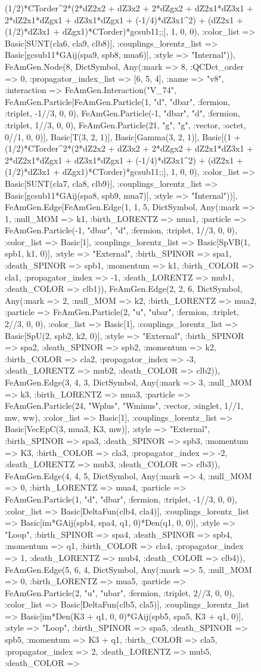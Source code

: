 \documentclass{revtex4}
\begin{document}
\begin{figure}[!htb]
\begin{center}
{(1/2)*CTorder^2*(2*dZ2x2 + dZ3x2 + 2*dZgx2 + dZ2x1*dZ3x1 + 2*dZ2x1*dZgx1 + dZ3x1*dZgx1 + (-1/4)*dZ3x1^2) + (dZ2x1 + (1/2)*dZ3x1 + dZgx1)*CTorder)*gcsub11;;], 1, 0, 0), :color_list => Basic[SUNT(cla6, cla9, clb8)], :couplings_lorentz_list => Basic[gcsub11*GAij(spa9, spb8, mua6)], :style => "Internal")), FeAmGen.Node(8, Dict{Symbol, Any}(:mark => 8, :QCDct_order => 0, :propagator_index_list => [6, 5, 4], :name => "v8", :interaction => FeAmGen.Interaction("V_74", FeAmGen.Particle[FeAmGen.Particle(1, "d", "dbar", :fermion, :triplet, -1//3, 0, 0), FeAmGen.Particle(-1, "dbar", "d", :fermion, :triplet, 1//3, 0, 0), FeAmGen.Particle(21, "g", "g", :vector, :octet, 0//1, 0, 0)], Basic[T(3, 2, 1)], Basic[Gamma(3, 2, 1)], Basic[(1 + (1/2)*CTorder^2*(2*dZ2x2 + dZ3x2 + 2*dZgx2 + dZ2x1*dZ3x1 + 2*dZ2x1*dZgx1 + dZ3x1*dZgx1 + (-1/4)*dZ3x1^2) + (dZ2x1 + (1/2)*dZ3x1 + dZgx1)*CTorder)*gcsub11;;], 1, 0, 0), :color_list => Basic[SUNT(cla7, cla8, clb9)], :couplings_lorentz_list => Basic[gcsub11*GAij(spa8, spb9, mua7)], :style => "Internal"))], FeAmGen.Edge[FeAmGen.Edge(1, 1, 5, Dict{Symbol, Any}(:mark => 1, :null_MOM => k1, :birth_LORENTZ => mua1, :particle => FeAmGen.Particle(-1, "dbar", "d", :fermion, :triplet, 1//3, 0, 0), :color_list => Basic[1], :couplings_lorentz_list => Basic[SpVB(1, spb1, k1, 0)], :style => "External", :birth_SPINOR => spa1, :death_SPINOR => spb1, :momentum => k1, :birth_COLOR => cla1, :propagator_index => -1, :death_LORENTZ => mub1, :death_COLOR => clb1)), FeAmGen.Edge(2, 2, 6, Dict{Symbol, Any}(:mark => 2, :null_MOM => k2, :birth_LORENTZ => mua2, :particle => FeAmGen.Particle(2, "u", "ubar", :fermion, :triplet, 2//3, 0, 0), :color_list => Basic[1], :couplings_lorentz_list => Basic[SpU(2, spb2, k2, 0)], :style => "External", :birth_SPINOR => spa2, :death_SPINOR => spb2, :momentum => k2, :birth_COLOR => cla2, :propagator_index => -3, :death_LORENTZ => mub2, :death_COLOR => clb2)), FeAmGen.Edge(3, 4, 3, Dict{Symbol, Any}(:mark => 3, :null_MOM => k3, :birth_LORENTZ => mua3, :particle => FeAmGen.Particle(24, "Wplus", "Wminus", :vector, :singlet, 1//1, mw, ww), :color_list => Basic[1], :couplings_lorentz_list => Basic[VecEpC(3, mua3, K3, mw)], :style => "External", :birth_SPINOR => spa3, :death_SPINOR => spb3, :momentum => K3, :birth_COLOR => cla3, :propagator_index => -2, :death_LORENTZ => mub3, :death_COLOR => clb3)), FeAmGen.Edge(4, 4, 5, Dict{Symbol, Any}(:mark => 4, :null_MOM => 0, :birth_LORENTZ => mua4, :particle => FeAmGen.Particle(1, "d", "dbar", :fermion, :triplet, -1//3, 0, 0), :color_list => Basic[DeltaFun(clb4, cla4)], :couplings_lorentz_list => Basic[im*GAij(spb4, spa4, q1, 0)*Den(q1, 0, 0)], :style => "Loop", :birth_SPINOR => spa4, :death_SPINOR => spb4, :momentum => q1, :birth_COLOR => cla4, :propagator_index => 1, :death_LORENTZ => mub4, :death_COLOR => clb4)), FeAmGen.Edge(5, 6, 4, Dict{Symbol, Any}(:mark => 5, :null_MOM => 0, :birth_LORENTZ => mua5, :particle => FeAmGen.Particle(2, "u", "ubar", :fermion, :triplet, 2//3, 0, 0), :color_list => Basic[DeltaFun(clb5, cla5)], :couplings_lorentz_list => Basic[im*Den(K3 + q1, 0, 0)*GAij(spb5, spa5, K3 + q1, 0)], :style => "Loop", :birth_SPINOR => spa5, :death_SPINOR => spb5, :momentum => K3 + q1, :birth_COLOR => cla5, :propagator_index => 2, :death_LORENTZ => mub5, :death_COLOR => }
\end{center}
\end{figure}
\end{document}
